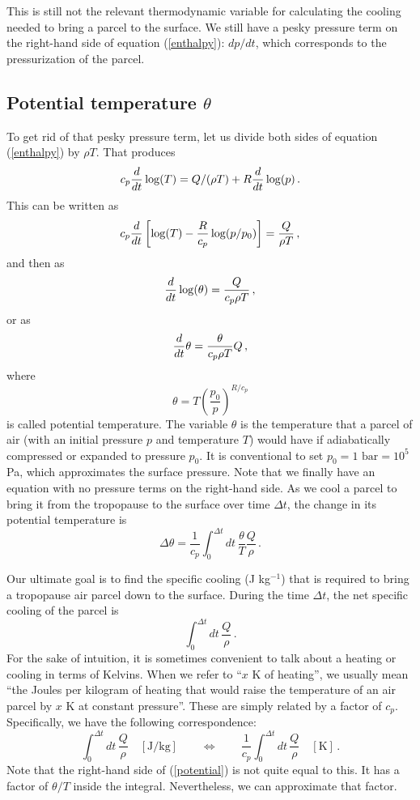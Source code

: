 \documentclass[12pt]{article}
\begin{document}
This is still not the relevant thermodynamic variable for calculating the cooling needed to bring a parcel to the surface.  We still have a pesky pressure term on the right-hand side of equation (\ref{enthalpy}): $dp/dt$, which corresponds to the pressurization of the parcel.


\subsection{Potential temperature $\theta$}


To get rid of that pesky pressure term, let us divide both sides of equation (\ref{enthalpy}) by $\rho T$.  That produces
\[
c_p {\frac{d}{dt}} \log(T) = Q/(\rho T) + R {\frac{d}{dt}} \log(p) \, .
\]
This can be written as
\[
c_p {\frac{d}{dt}} \left[ \log(T) - \frac{R}{c_p} \log(p/p_0) \right] = \frac{Q}{\rho T} \, ,
\]
and then as
\[
{\frac{d}{dt}} \log(\theta) = \frac{Q}{c_p \rho T} \, ,
\]
or as
\begin{equation}
{\frac{d}{dt}} \theta = \frac{\theta}{c_p \rho T} Q \, , \label{potential}
\end{equation}
where
\begin{equation}
\theta = T \left( \frac{p_0}{p} \right)^{R/c_p} \label{potdef}
\end{equation}
is called potential temperature.  The variable $\theta$ is the temperature that a parcel of air (with an initial pressure $p$ and temperature $T$) would have if adiabatically compressed or expanded to pressure $p_0$.  It is conventional to set $p_0 = 1 \text{ bar} = 10^5$ Pa, which approximates the surface pressure.  Note that we finally have an equation with no pressure terms on the right-hand side.  As we cool a parcel to bring it from the tropopause to the surface over time $\Delta t$, the change in its potential temperature is
\[
\Delta \theta = \frac{1}{c_p} \int_0^{\Delta t} dt \, \frac{\theta}{T} \frac{Q}{\rho} \, .
\]


Our ultimate goal is to find the specific cooling (J kg$^{-1}$) that is required to bring a tropopause air parcel down to the surface.  During the time $\Delta t$, the net specific cooling of the parcel is
\[
\int_0^{\Delta t} dt \, \frac{Q}{\rho} \, .
\]
For the sake of intuition, it is sometimes convenient to talk about a heating or cooling in terms of Kelvins.  When we refer to ``$x$ K of heating'', we usually mean ``the Joules per kilogram of heating that would raise the temperature of an air parcel by $x$ K at constant pressure''.  These are simply related by a factor of $c_p$.  Specifically, we have the following correspondence:
\[
\int_0^{\Delta t} dt\, \frac{Q}{\rho} \quad [\text{J/kg}] \qquad \Longleftrightarrow \qquad \frac{1}{c_p} \int_0^{\Delta t} dt \, \frac{Q}{\rho} \quad [\text{K}] \, .
\]
Note that the right-hand side of (\ref{potential}) is not quite equal to this.  It has a factor of $\theta/T$ inside the integral.  Nevertheless, we can approximate that factor.
\end{document}
